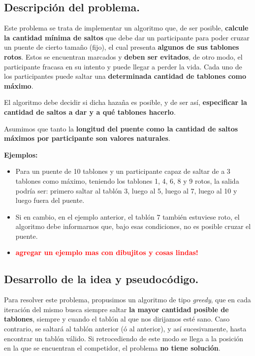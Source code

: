 \subsection{Descripción del problema.}

\vspace*{0.3cm}

Este problema se trata de implementar un algoritmo que, de ser posible,
\textbf{calcule la cantidad mínima de saltos} que debe dar un participante para poder cruzar un
puente de cierto tamaño (fijo), el cual presenta \textbf{algunos de sus tablones rotos}. Estos se encuentran
marcados y \textbf{deben ser evitados}, de otro modo, el participante fracasa en su intento y puede llegar a
perder la vida. Cada uno de los participantes puede saltar una \textbf{determinada cantidad de tablones como máximo}. \medskip

El algoritmo debe decidir si dicha hazaña es posible, y de ser así,
\textbf{especificar la cantidad de saltos a dar y a qué tablones hacerlo}. \medskip

Asumimos que tanto la \textbf{longitud del puente como la cantidad de saltos máximos por participante
son valores naturales}.

\vspace*{0.5cm}

\textbf{Ejemplos:}
\begin{itemize}
  \item Para un puente de 10 tablones y un participante capaz de saltar de a 3
  tablones como máximo, teniendo los tablones 1, 4, 6, 8 y 9 rotos, la salida podría ser:
  primero saltar al tablón 3, luego al 5, luego al 7, luego al 10 y luego fuera del puente.
  \item Si en cambio, en el ejemplo anterior, el tablón 7 también estuviese roto,
  el algoritmo debe informarnos que, bajo esas condiciones, no es posible cruzar el puente.
  \item \textcolor{red}{\textbf{agregar un ejemplo mas con dibujitos y cosas lindas!}}
\end{itemize}



\subsection{Desarrollo de la idea y pseudocódigo.}

\vspace*{0.3cm}

Para resolver este problema, propusimos un algoritmo de tipo \textit{greedy}, que en cada iteración
del mismo busca siempre saltar \textbf{la mayor cantidad posible de tablones}, siempre y cuando el
tablón al que nos dirijamos esté sano. Caso contrario, se saltará al tablón anterior (ó al anterior), 
y así sucesivamente, hasta encontrar un tablón válido.
Si retrocediendo de este modo se llega a la posición en la que se encuentran el competidor, el problema
\textbf{no tiene solución}.

